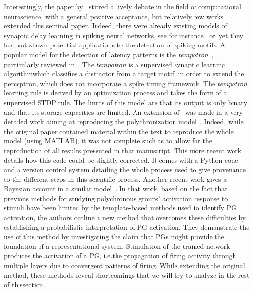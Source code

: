 \documentclass[brainsci, %
               review,accept,pdftex,moreauthors %
               ]{Definitions/mdpi}
\providecommand{\DIFadd}[1]{{\protect\color{blue}\uwave{#1}}} %
\providecommand{\DIFaddbegin}{} %
\providecommand{\DIFaddend}{} %
\newcommand{\DIFaddincludegraphics}[2][]{{\color{blue}\fbox{\DIFOincludegraphics[#1]{#2}}}} %
\DeclareRobustCommand{\DIFaddbegin}{\DIFOaddbegin \let\includegraphics\DIFaddincludegraphics} %
\DeclareRobustCommand{\DIFaddend}{\DIFOaddend \let\includegraphics\DIFOincludegraphics} %
\begin{document}
\DIFaddend %
Interestingly, the paper by~\citep{izhikevich_polychronization_2006} stirred a lively debate in the field of computational neuroscience, with a general positive acceptance, but relatively few works extended this seminal paper. Indeed, there were already existing models of synaptic delay learning in spiking neural networks, see for instance~\citep{huning_synaptic_1998} or~\citep{eurich_dynamics_1999}\DIFaddbegin \DIFadd{, }\DIFaddend yet they had not shown potential applications to the detection of spiking motifs. A popular model for the detection of latency patterns is the \emph{tempotron}~\citep{gutig_tempotron_2006}, particularly reviewed in~\citep{gutig_spike_2014}. The \emph{tempotron} is a supervised synaptic learning algorithm\DIFaddbegin \DIFadd{, }\DIFaddend which classifies a distractor from a target motif, in order to extend the perceptron, which does not incorporate a spike timing framework. The \emph{tempotron} learning rule is derived by an optimization process and takes the form of a supervised STDP rule. The limits of this model are that its output is only binary and that its storage capacities are limited. An extension of~\citep{izhikevich_polychronization_2006} was made in a very detailed work aiming at reproducing the polychronization model~\citep{pauli_reproducing_2018}. Indeed, while the original paper contained material within the text to reproduce the whole model (using MATLAB), it was not complete such as to allow for the reproduction of all results presented in that manuscript. This more recent work details how this code could be slightly corrected. It comes with a Python code and a version control system detailing the whole process used to give provenance to the different steps in this scientific process. Another recent work gives a Bayesian account in a similar model~\citep{guise_bayesian_2014}. In that work, based on the fact that previous methods for studying polychronous groups' activation response to stimuli have been limited by the template-based methods used to identify PG activation, the authors outline a new method that overcomes these difficulties by establishing a probabilistic interpretation of PG activation. They demonstrate the use of this method by investigating the claim that PGs might provide the foundation of a representational system. Stimulation of the trained network produces the activation of a PG, i.e.\DIFaddbegin \DIFadd{, }\DIFaddend the propagation of firing activity through multiple layers due to convergent patterns of firing. While extending the original method, these methods reveal shortcomings that we will try to analyze in the rest of this\DIFaddbegin \DIFadd{~}\DIFaddend section.
\end{document}
